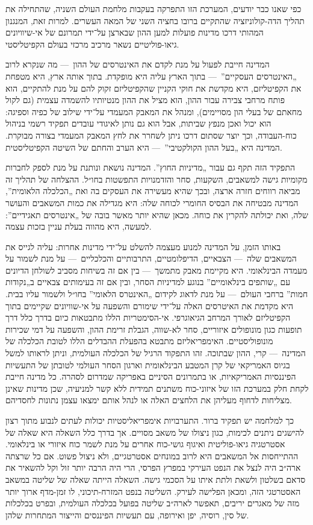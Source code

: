 כפי שאנו כבר יודעים, המערכת הזו התפרקה בעקבות מלחמת העולם השניה, שהתחילה את תהליך הדה-קולוניזציה שהתקיים ברובו בחציה השני של המאה העשרים. למרות זאת, המנגנון המהותי דרכו מדינות פועלות למען ההון שבארצן על־ידי  תמרונם של אי-שיוויונים גיאו-פוליטיים נשאר מרכיב מרכזי בעולם הקפיטליסטי.

המדינה חייבת לפעול על מנת לקדם את האינטרסים של ההון~— מה שנקרא לרוב „האינטרסים העסקיים”~— בתוך הארץ עליה היא מופקדת. בתוך אותה ארץ, היא מטפחת את הקפיטליזם, היא מקדשת את חוקי הקניין שהקפיטליזם זקוק להם על מנת להתקיים, הוא פותח מרחבי צבירה עבור ההון, הוא מציל את ההון מנטיותיו להשמדה עצמית (גם לקול מחאתם של בעלי הון מסויימים), ומנהל את המאבק המעמדי על־ידי שילוב של כפיה וספיגה: הוא יכול ואכן מנפץ שביתות, אבל הוא גם נותן לאיגודי עובדים תפקיד רשמי בניהול כוח-העבודה, וכך יוצר שסתום דרכו ניתן לשחרר את לחץ המאבק המעמדי בצורה מבוקרת. המדינה היא „בעל ההון הקולקטיבי”~— היא הערב והחתם של השיטה הקפיטליסטית.

התפקיד הזה תקף גם עבור „מדיניות החוץ”. המדינה נושאת ונותנת על מנת לספק לחברות מקומיות גישה למשאבים, השקעות, סחר והזדמנויות התפשטות בחו״ל. ההצלחה של תהליך זה מביאה רווחים חזרה ארצה, ובכך שהיא מעשירה את העסקים בה ואת „הכלכלה הלאומית”, המדינה מבטיחה את הבסיס החומרי לכוחה שלה: היא מגדילה את כמות המשאבים והעושר שלה, ואת יכולתה להקרין את כוחה. מכאן שהיא יותר מאשר בובה של „אינטרסים תאגידיים”: למעשה, היא מהווה בעלת עניין בזכות עצמה.

באותו הזמן, על המדינה למנוע מעצמה להשלט על־ידי מדינות אחרות: עליה לגייס את המשאבים שלה~— הצבאיים, הדיפלומטיים, התרבותיים והכלכליים~— על מנת לשמור על מעמדה הבינלאומי. היא מקיימת מאבק מתמשך~— בין אם זה בשיחות מסביב לשולחן הדיונים עם „שותפים בינלאומיים” בנוגע למדיניות הסחר, ובין אם זה בעימותים צבאיים ב„נקודות חמות” ברחבי העולם~— על מנת לדאוג לקידום „האינטרס הלאומי” בחו״ל ולשמור עליו בבית. היא מקדמת את האיטרסים האלה על־ידי שימורם והשפעה על אי-שוויונים שקיימים בתוך הקפיטליזם לאורך המרחב הגיאוגרפי. אי-הסימטריות הללו מתבטאות כיום בדרך כלל דרך תופעות כגון מונופולים איזוריים, סחר לא-שווה, הגבלת זרימת ההון, והשפעה על דמי שכירות מונופוליסטיים. האימפריאליזם מתבטא בהפעלת ההבדלים הללו לטובת הכלכלה של המדינה~— קרי, ההון שבתוכה. זהו התפקוד הרגיל של הכלכלה העולמית, וניתן לראותו למשל בגיוס האמריקאי של קרן המטבע הבינלאומית וארגון הסחר העולמי לטובתן של התעשיות הפיננסיות האמריקאיות, או בתמרונים הסיניים באפריקה שמדרום לסהרה. כל מדינה חייבת לקחת חלק במערכת הזו של איזוני-כוח משתנים תמידית ללא  קשר למניעיה, שכן מדינות שאינן מצליחות לדחוף מעליהן את הלחצים האלה או לנהל אותם ימצאו עצמן נתונות לחסדיהם.

כך למלחמה יש תפקיד ברור. התערבויות אימפריאליסטיות יכולות לעתים לנבוע מתוך רצון להישגים ניתנים לכימות, כגון ניצולו של משאב מסויים. אך בדרך כלל השאלה היא שאלה של אסטרטגיה גיאו-פוליטית ואיגוף גושי-כוח אחרים על מנת לשמר כוח איזורי או בינלאומי. ההתייחסות אל המשאבים היא לרוב במונחים אסטרטגיים, ולא ניצול פשוט. אם כל שרצתה ארה״ב היה לנצל את הנפט העירקי במפרץ הפרסי, הרי היה הרבה יותר זול וקל להשאיר את סדאם בשלטון ולשאת ולתת איתו על הסכמי גישה. השאלה הייתה שאלה של שליטה במשאב האסטרטגי הזה, ומכאן הפלישה לעירק. השליטה בנפט המזרח-תיכוני, לו זמן-מדף ארוך יותר מזה של מאגרים יריבים, תאפשר לארה״ב שליטה בפועל בכלכלה העולמית, ובפרט בכלכלות של סין, רוסיה, יפן ואירופה, עם תעשיות הפיננסים והייצור המתחרות שלהן.

